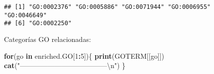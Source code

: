 \documentclass[
]{article}
\newenvironment{Shaded}{\begin{snugshade}}{\end{snugshade}}
\newcommand{\CharTok}[1]{\textcolor[rgb]{0.31,0.60,0.02}{#1}}
\newcommand{\ControlFlowTok}[1]{\textcolor[rgb]{0.13,0.29,0.53}{\textbf{#1}}}
\newcommand{\DataTypeTok}[1]{\textcolor[rgb]{0.13,0.29,0.53}{#1}}
\newcommand{\DecValTok}[1]{\textcolor[rgb]{0.00,0.00,0.81}{#1}}
\newcommand{\KeywordTok}[1]{\textcolor[rgb]{0.13,0.29,0.53}{\textbf{#1}}}
\newcommand{\NormalTok}[1]{#1}
\newcommand{\OperatorTok}[1]{\textcolor[rgb]{0.81,0.36,0.00}{\textbf{#1}}}
\newcommand{\StringTok}[1]{\textcolor[rgb]{0.31,0.60,0.02}{#1}}
\begin{document}
\begin{Shaded}
\end{Shaded}

\begin{verbatim}
## [1] "GO:0002376" "GO:0005886" "GO:0071944" "GO:0006955" "GO:0046649"
## [6] "GO:0002250"
\end{verbatim}

Categorías GO relacionadas:

\begin{Shaded}
\begin{Highlighting}[]
\ControlFlowTok{for}\NormalTok{(go }\ControlFlowTok{in}\NormalTok{ enriched.GO[}\DecValTok{1}\OperatorTok{:}\DecValTok{5}\NormalTok{])\{}
  \KeywordTok{print}\NormalTok{(GOTERM[[go]])}
  \KeywordTok{cat}\NormalTok{(}\StringTok{"--------------------------------------}\CharTok{\textbackslash{}n}\StringTok{"}\NormalTok{)}
\NormalTok{  \}}
\end{Highlighting}
\end{Shaded}
\end{document}
